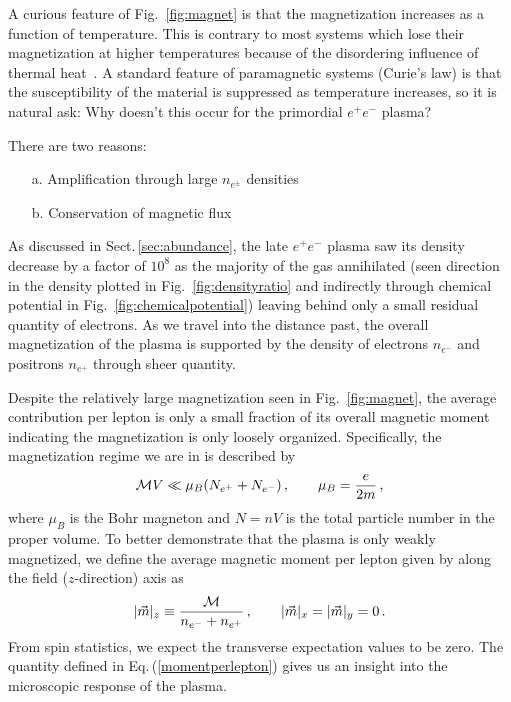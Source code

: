 \documentclass[a4paper]{article}
\newcommand{\req}[1]{Eq.\,(\ref{#1})}
\newcommand{\rf}[1]{Fig.~{\ref{#1}}}
\newcommand{\rsec}[1]{Sect.\,{\ref{#1}}}
\begin{document}
A curious feature of \rf{fig:magnet} is that the magnetization increases as a function of temperature. This is contrary to most systems which lose their magnetization at higher temperatures because of the disordering influence of thermal heat~\cite{huang1991statistical}. A standard feature of paramagnetic systems (Curie's law) is that the susceptibility of the material is suppressed as temperature increases, so it is natural ask: Why doesn't this occur for the primordial $e^{+}e^{-}$ plasma?

There are two reasons:
\begin{itemize}
    \item[a.] Amplification through large $n_{e^{\pm}}$ densities
    \item[b.] Conservation of magnetic flux
\end{itemize}

As discussed in \rsec{sec:abundance}, the late $e^{+}e^{-}$ plasma saw its density decrease by a factor of $10^{8}$ as the majority of the gas annihilated (seen direction in the density plotted in \rf{fig:densityratio} and indirectly through chemical potential in \rf{fig:chemicalpotential}) leaving behind only a small residual quantity of electrons. As we travel into the distance past, the overall magnetization of the plasma is supported by the density of electrons $n_{e^{-}}$ and positrons $n_{e^{+}}$ through sheer quantity.

Despite the relatively large magnetization seen in \rf{fig:magnet}, the average contribution per lepton is only a small fraction of its overall magnetic moment indicating the magnetization is only loosely organized. Specifically, the magnetization regime we are in is described by
\begin{align}
    \label{fractionalmagnetization}
    {\cal M}V\ll\mu_{B}(N_{e^{+}}+N_{e^{-}})\,,\qquad\mu_{B}=\frac{e}{2m}\,,
\end{align}
where $\mu_{B}$ is the Bohr magneton and $N=nV$ is the total particle number in the proper volume. To better demonstrate that the plasma is only weakly magnetized, we define the average magnetic moment per lepton given by along the field ($z$-direction) axis as
\begin{align}
    \label{momentperlepton}
    \vert\vec{m}\vert_{z}\equiv\frac{{\cal M}}{n_{e^{-}}+n_{e^{+}}}\,,\qquad\vert\vec{m}\vert_{x}=\vert\vec{m}\vert_{y}=0\,.
\end{align}
From spin statistics, we expect the transverse expectation values to be zero. The quantity defined in \req{momentperlepton} gives us an insight into the microscopic response of the plasma.
\end{document}
